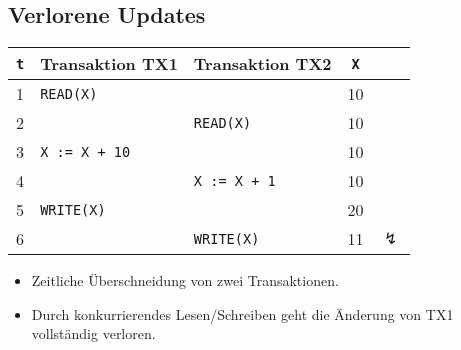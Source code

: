 		\subsection{Verlorene Updates} %
			\begin{table}[H]
				\centering
				\begin{tabular}{c | l | l | c c}
					\textbf{\texttt{t}} & \textbf{Transaktion TX1} & \textbf{Transaktion TX2} & \textbf{\texttt{X}} &                \\ \hline
					1                   & \texttt{READ(X)}         &                          & 10                  &                \\
					2                   &                          & \texttt{READ(X)}         & 10                  &                \\
					3                   & \texttt{X := X + 10}     &                          & 10                  &                \\
					4                   &                          & \texttt{X := X + 1}      & 10                  &                \\
					5                   & \texttt{WRITE(X)}        &                          & 20                  &                \\
					6                   &                          & \texttt{WRITE(X)}        & 11                  & \(\lightning\)
				\end{tabular}
			\end{table}

			\begin{itemize}
				\item Zeitliche Überschneidung von zwei Transaktionen.
				\item Durch konkurrierendes Lesen/Schreiben geht die Änderung von TX1 vollständig verloren.
			\end{itemize}

